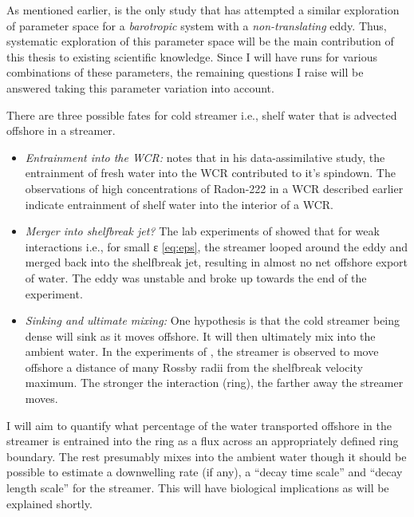 As mentioned earlier, \cite{Wang1992} is the only study that has attempted a similar exploration of parameter space for a \emph{barotropic} system with a \emph{non-translating} eddy. Thus, systematic exploration of this parameter space will be the main contribution of this thesis to existing scientific knowledge. Since I will have runs for various combinations of these parameters, the remaining questions I raise will be answered taking this parameter variation into account.


There are three possible fates for cold streamer i.e., shelf water that is advected offshore in a streamer.
\begin{itemize}
\item \emph{Entrainment into the WCR:} \cite{Chen2011} notes that in his data-assimilative study, the entrainment of fresh water into the WCR contributed to it’s spindown.  The observations of high concentrations of Radon-222 in a WCR described earlier  \citep{Orr1985} indicate entrainment of shelf water into the interior of a WCR.

\item \emph{Merger into shelfbreak jet?} The lab experiments of \cite{Cenedese2012} showed that for weak interactions i.e., for small ε \eqref{eq:eps}, the streamer looped around the eddy and merged back into the shelfbreak jet, resulting in almost no net offshore export of water. The eddy was unstable and broke up towards the end of the experiment. 

\item \emph{Sinking and ultimate mixing:} One hypothesis is that the cold streamer being dense will sink as it moves offshore. It will then ultimately mix into the ambient water. In the experiments of \cite{Cenedese2012}, the streamer is observed to move offshore a distance of many Rossby radii from the shelfbreak velocity maximum. The stronger the interaction (ring), the farther away the streamer moves.
\end{itemize}

I will aim to quantify what percentage of the water transported offshore in the streamer is entrained into the ring as a flux across an appropriately defined ring boundary. The rest presumably mixes into the ambient water though it should be possible to estimate a downwelling rate (if any), a “decay time scale” and “decay length scale” for the streamer. This will have biological implications as will be explained shortly. 

